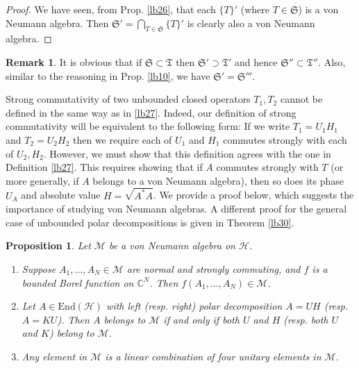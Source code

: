 \documentclass[12pt,b5paper,notitlepage]{article}
\theoremstyle{definition}
\newtheorem{rem}[df]{Remark}
\theoremstyle{plain}
\newtheorem{pp}[df]{Proposition}
\newcommand{\fk}{\mathfrak}
\newcommand{\mc}{\mathcal}
\newcommand{\End}{\mathrm{End}} %
\newcommand{\Cbb}{\mathbb C}
\numberwithin{equation}{section}
\begin{document}
\begin{proof}
We have seen, from Prop. \ref{lb26}, that each $\{T\}'$ (where $T\in\fk S$)  is a von Neumann algebra. Then $\fk S'=\bigcap_{T\in\fk S}\{T\}'$ is clearly also a von Neumann algebra.
\end{proof}

\begin{rem}
It is obvious that if $\fk S\subset\fk T$ then $\fk S'\supset\fk T'$ and hence $\fk S''\subset\fk T''$. Also, similar to the reasoning in Prop. \ref{lb10}, we have $\fk S'=\fk S'''$.
\end{rem}



Strong commutativity of two unbounded closed operators $T_1,T_2$ cannot be defined in the same way as in \ref{lb27}. Indeed, our definition of strong commutativity will be equivalent to the following form: If we write $T_1=U_1H_1$ and $T_2=U_2H_2$ then we require each of $U_1$ and $H_1$ commutes strongly with each of $U_2,H_2$. However, we must show that this definition agrees with the one in Definition \ref{lb27}. This requires showing that if $A$ commutes strongly with $T$ (or more generally, if $A$ belongs to a von Neumann algebra), then so does its phase $U_A$ and absolute value $H=\sqrt{A^*A}$. We provide a proof below, which suggests the importance of studying von Neumann algebras. A different proof for the general case of unbounded polar decompositions is given in Theorem \ref{lb30}.


\begin{pp}\label{lb29}
Let $\mc M$ be a von Neumann algebra on $\mc H$.
\begin{enumerate}
\item Suppose $A_1,\dots,A_N\in\mc M$ are normal and strongly commuting, and $f$ is a bounded Borel function on $\Cbb^N$. Then $f(A_1,\dots,A_N)\in\mc M$. 
\item Let $A\in\End(\mc H)$ with left (resp. right) polar decomposition $A=UH$ (resp. $A=KU$). Then $A$ belongs to $\mc M$ if and only if both $U$ and $H$ (resp. both $U$ and $K$)  belong to $\mc M$.
\item Any element in $\mc M$ is a linear combination of four unitary elements in $\mc M$.
\end{enumerate}
\end{pp}
\end{document}
